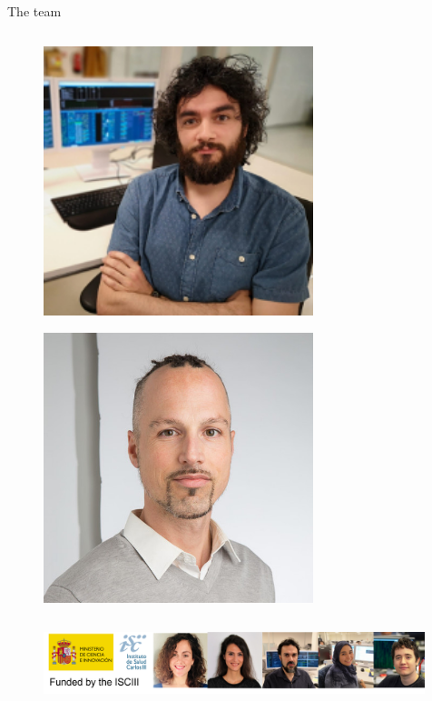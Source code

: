 \documentclass[compress,ignorenonframetext,aspectratio=1610]{beamer}
\begin{document}
\begin{frame}{The team}
\begin{columns}
			\begin{column}{0.2\textwidth}
				\begin{figure}
					\includegraphics[width=0.7\textwidth]{figs/people/ruben_pc200.jpg}	
				\end{figure}
				\begin{figure}
					\includegraphics[width=0.7\textwidth]{figs/people/gerrit.jpeg}	
				\end{figure}
			\end{column}
		\end{columns}
		
		\begin{columns}
			\begin{column}{0.6\textwidth}

			\begin{figure}
				\includegraphics[width=0.99\textwidth]{figs/people/funding_sarsvoc2.png}	
			\end{figure}
			\end{column}


\end{columns}
\end{frame}
\end{document}

